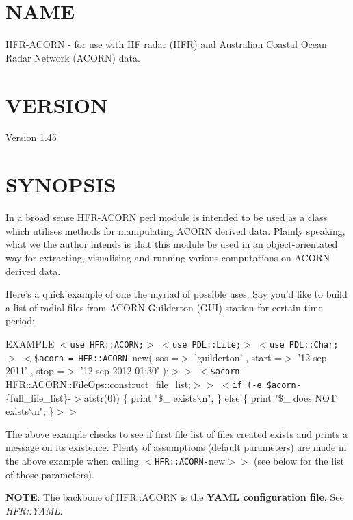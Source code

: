 \section{NAME\label{NAME}}


HFR-ACORN - for use with HF radar (HFR) and Australian Coastal Ocean Radar Network (ACORN) data.

\section{VERSION\label{VERSION}}


Version 1.45

\section{SYNOPSIS\label{SYNOPSIS}}


In a broad sense HFR-ACORN perl module is intended to be used as a class which utilises methods for manipulating ACORN derived data.  Plainly speaking, what we the author intends is that this module be used in an object-orientated way for extracting, visualising and running various computations on ACORN derived data.



Here's a quick example of one the myriad of possible uses. Say you'd like to build a list of radial files from ACORN Guilderton (GUI) station for certain time period:



EXAMPLE
\texttt{$<$use HFR::ACORN;}$>$
\texttt{$<$use PDL::Lite;}$>$
\texttt{$<$use PDL::Char;}$>$
\texttt{$<$\$acorn = HFR::ACORN-}new( sos =$>$ 'guilderton' , start =$>$ '12 sep 2011' , stop =$>$ '12 sep 2012 01:30' );$>$$>$
\texttt{$<$\$acorn-}HFR::ACORN::FileOps::construct\_file\_list;$>$$>$
\texttt{$<$if (-e \$acorn-}\{full\_file\_list\}-$>$atstr(0)) \{ print "\$\_ exists$\backslash$n"; \} else \{ print "\$\_ does NOT exists$\backslash$n"; \}$>$$>$



The above example checks to see if first file list of files created exists and prints a message on its existence.
Plenty of assumptions (default parameters) are made in the above example when calling \texttt{$<$HFR::ACORN-}new$>$$>$ (see below for the list of those parameters).



\textbf{NOTE}: The backbone of HFR::ACORN is the \textbf{YAML configuration file}. See \emph{HFR::YAML}.

